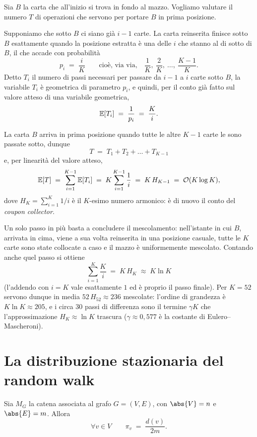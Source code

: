 Sia $B$ la carta che all'inizio si trova in fondo al mazzo. Vogliamo valutare il numero $T$
di operazioni che servono per portare $B$ in prima posizione.

Supponiamo che sotto $B$ ci siano già $i-1$ carte. La carta reinserita finisce sotto $B$
esattamente quando la posizione estratta è una delle $i$ che stanno al di sotto di $B$, il
che accade con probabilità
\[
  p_i \;=\; \frac{i}{K}
  \qquad\text{cioè, via via,}\quad \frac{1}{K},\ \frac{2}{K},\ \dots,\ \frac{K-1}{K}.
\]
Detto $T_i$ il numero di passi necessari per passare da $i-1$ a $i$ carte sotto $B$, la
variabile $T_i$ è geometrica di parametro $p_i$, e quindi, per il conto già fatto sul valore
atteso di una variabile geometrica,
\[
  \mathbb{E}[T_i] \;=\; \frac{1}{p_i} \;=\; \frac{K}{i}.
\]

La carta $B$ arriva in prima posizione quando tutte le altre $K-1$ carte le sono passate
sotto, dunque
\[
  T \;=\; T_1 + T_2 + \dots + T_{K-1}
\]
e, per linearità del valore atteso,
\[
  \mathbb{E}[T] \;=\; \sum_{i=1}^{K-1} \mathbb{E}[T_i]
        \;=\; K \sum_{i=1}^{K-1} \frac{1}{i}
        \;=\; K\,H_{K-1}
        \;=\; \mathcal{O}(K \log K),
\]
dove $H_K = \sum_{i=1}^{K} 1/i$ è il $K$-esimo numero armonico: è di nuovo il conto del
\emph{coupon collector}.

\begin{osservazione}
  Un solo passo in più basta a concludere il mescolamento: nell'istante in cui $B$, arrivata
  in cima, viene a sua volta reinserita in una posizione casuale, tutte le $K$ carte sono
  state collocate a caso e il mazzo è uniformemente mescolato. Contando anche quel passo si
  ottiene
  \[
    \sum_{i=1}^{K} \frac{K}{i} \;=\; K\,H_K \;\approx\; K \ln K
  \]
  (l'addendo con $i=K$ vale esattamente $1$ ed è proprio il passo finale). Per $K = 52$
  servono dunque in media $52\,H_{52} \approx 236$ mescolate: l'ordine di grandezza è
  $K \ln K \approx 205$, e i circa $30$ passi di differenza sono il termine $\gamma K$ che
  l'approssimazione $H_K \approx \ln K$ trascura ($\gamma \approx 0{,}577$ è la costante di
  Eulero--Mascheroni).
\end{osservazione}

\section{La distribuzione stazionaria del random walk}

\begin{lemma}\label{lem:stazionaria-grado}
  Sia $M_G$ la catena associata al grafo $G = (V,E)$, con $\abs{V} = n$ e $\abs{E} = m$.
  Allora
  \[
    \forall v \in V \qquad \pi_v \;=\; \frac{d(v)}{2m}.
  \]
\end{lemma}

